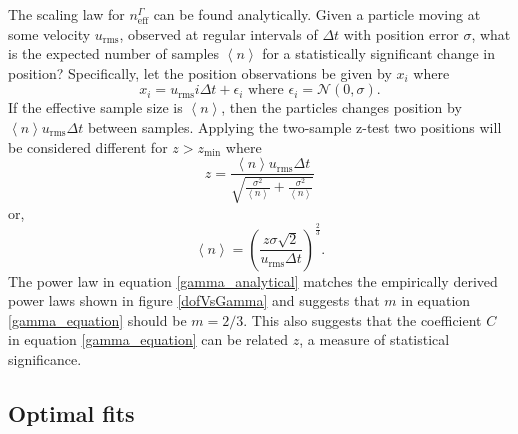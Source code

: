 \documentclass[10pt,journal]{IEEEtran}
\begin{document}
The scaling law for $n_{\textrm{eff}}^\Gamma$ can be found analytically. Given a particle moving at some velocity $u_\textrm{rms}$, observed at regular intervals of $\Delta t$ with position error $\sigma$, what is the expected number of samples $\left\langle n \right\rangle$ for a statistically significant change in position? Specifically, let the position observations be given by $x_i$ where
\begin{equation}
x_i = u_\textrm{rms} i \Delta t + \epsilon_i \textrm{ where } \epsilon_i = \mathcal{N}(0,\sigma).
\end{equation}
If the effective sample size is $\left\langle n \right\rangle$, then the particles changes position by $\left\langle n \right\rangle u_\textrm{rms} \Delta t$ between samples. Applying the two-sample z-test two positions will be considered different for $z>z_\textrm{min}$ where
\begin{equation}
z= \frac{\left\langle n \right\rangle u_\textrm{rms} \Delta t}{\sqrt{\frac{\sigma^2}{\left\langle n \right\rangle} + \frac{\sigma^2}{\left\langle n \right\rangle} }}
\end{equation}
or,
\begin{equation}
\label{gamma_analytical}
\left\langle n \right\rangle = \left( \frac{z \sigma \sqrt{2}}{u_\textrm{rms} \Delta t} \right)^{\frac{2}{3}}.
\end{equation}
The power law in equation \ref{gamma_analytical} matches the empirically derived power laws shown in figure \ref{dofVsGamma} and suggests that $m$ in equation \ref{gamma_equation} should be $m=2/3$. This also suggests that the coefficient $C$ in equation \ref{gamma_equation} can be related $z$, a measure of statistical significance.




\subsection{Optimal fits} \label{optimal_fits}
\end{document}
